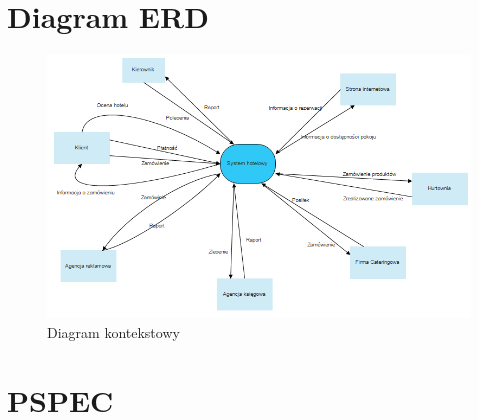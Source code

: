 \documentclass[a4paper, 11pt]{article}
\begin{document}
	
	
	
	
	\section{Diagram ERD}
	\indent
	\begin{figure}[H]%
			\includegraphics[scale=0.8]{Img/kontekstowy.png}
			\caption{Diagram kontekstowy}
	\end{figure}
	
	
	
	
	\newpage
	\section{PSPEC}
\end{document}
